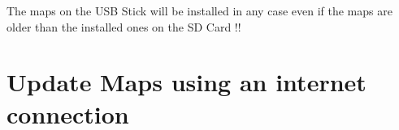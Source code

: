\warning The maps on the USB Stick will be installed in any case even if the maps 
are older than the installed ones on the SD Card !!

\chapter{Update Maps using an internet connection}


\begin{quote}
\ovwebsite{}
\end{quote}